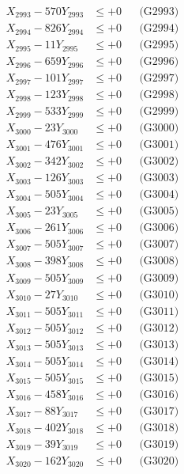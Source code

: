 \documentclass[a4paper,10pt]{article}
\begin{document}
{\begin{align}
X_{2993} - 570Y_{2993} &\leq +0 && \text{(G2993)} \\
X_{2994} - 826Y_{2994} &\leq +0 && \text{(G2994)} \\
X_{2995} - 11Y_{2995} &\leq +0 && \text{(G2995)} \\
X_{2996} - 659Y_{2996} &\leq +0 && \text{(G2996)} \\
X_{2997} - 101Y_{2997} &\leq +0 && \text{(G2997)} \\
X_{2998} - 123Y_{2998} &\leq +0 && \text{(G2998)} \\
X_{2999} - 533Y_{2999} &\leq +0 && \text{(G2999)} \\
X_{3000} - 23Y_{3000} &\leq +0 && \text{(G3000)} \\
\allowbreak
X_{3001} - 476Y_{3001} &\leq +0 && \text{(G3001)} \\
X_{3002} - 342Y_{3002} &\leq +0 && \text{(G3002)} \\
X_{3003} - 126Y_{3003} &\leq +0 && \text{(G3003)} \\
X_{3004} - 505Y_{3004} &\leq +0 && \text{(G3004)} \\
X_{3005} - 23Y_{3005} &\leq +0 && \text{(G3005)} \\
X_{3006} - 261Y_{3006} &\leq +0 && \text{(G3006)} \\
X_{3007} - 505Y_{3007} &\leq +0 && \text{(G3007)} \\
X_{3008} - 398Y_{3008} &\leq +0 && \text{(G3008)} \\
X_{3009} - 505Y_{3009} &\leq +0 && \text{(G3009)} \\
X_{3010} - 27Y_{3010} &\leq +0 && \text{(G3010)} \\
\allowbreak
X_{3011} - 505Y_{3011} &\leq +0 && \text{(G3011)} \\
X_{3012} - 505Y_{3012} &\leq +0 && \text{(G3012)} \\
X_{3013} - 505Y_{3013} &\leq +0 && \text{(G3013)} \\
X_{3014} - 505Y_{3014} &\leq +0 && \text{(G3014)} \\
X_{3015} - 505Y_{3015} &\leq +0 && \text{(G3015)} \\
X_{3016} - 458Y_{3016} &\leq +0 && \text{(G3016)} \\
X_{3017} - 88Y_{3017} &\leq +0 && \text{(G3017)} \\
X_{3018} - 402Y_{3018} &\leq +0 && \text{(G3018)} \\
X_{3019} - 39Y_{3019} &\leq +0 && \text{(G3019)} \\
X_{3020} - 162Y_{3020} &\leq +0 && \text{(G3020)} \\

\end{align}}
\end{document}
